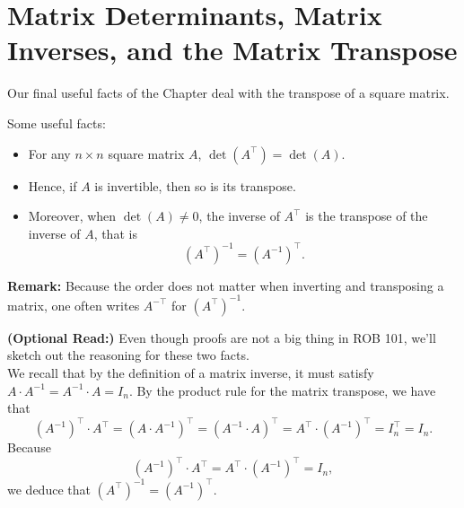  \section{Matrix Determinants, Matrix Inverses, and the Matrix Transpose}
 
 Our final useful facts of the Chapter deal with the transpose of a square matrix.
 
 \vspace*{0.2cm}


\begin{tcolorbox}[title=\textbf{Determinant and Matrix Inverse of $A^\top$}]
Some useful facts:

\begin{itemize}
    \item For any $n \times n$ square matrix  $A$, $\det(A^\top) = \det(A)$. 
    \item Hence, if $A$ is invertible, then so is its transpose. 
    \item Moreover, when $\det(A) \neq 0$, the inverse of $A^\top$ is the transpose of the inverse of $A$, that is
$$\left(A^\top\right)^{-1} =  \left(A^{-1}\right)^{\top}.$$
\end{itemize}
\textbf{Remark:} Because the order does not matter when inverting and transposing a matrix, one often writes $A^{-\top}$ for $\left(A^\top\right)^{-1}$.
\end{tcolorbox}
\vspace*{0.2cm}

\textbf{(Optional Read:)} Even though proofs are not a big thing in ROB 101, we'll sketch out the reasoning for these two facts. \\

We recall that by the definition of a matrix inverse, it must satisfy $A \cdot A^{-1} = A^{-1} \cdot A  = I_n$. By the product rule for the matrix transpose, we have that 
$$\left(A^{-1}\right)^\top \cdot A ^\top = \left(A \cdot A^{-1}\right)^\top  =  \left(A^{-1}  \cdot A\right)^\top = A^\top \cdot  \left(A^{-1} \right)^\top =  I_n^\top = I_n. $$
Because 
$$\left(A^{-1}\right)^\top \cdot A ^\top = A^\top \cdot  \left(A^{-1} \right)^\top = I_n,$$
we deduce that $\left(A^\top\right)^{-1} =  \left(A^{-1}\right)^{\top}$.\\


